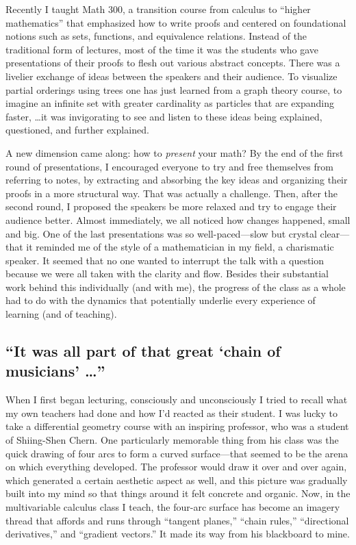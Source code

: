 \documentclass{rs}
\theoremstyle{definition}
\theoremstyle{remark}
\renewcommand{\=}{\approx}
\renewcommand{\-}{\sim}
\numberwithin{equation}{section}
\begin{document}
Recently I taught Math 300, a transition course from calculus to ``higher 
mathematics'' that emphasized how to write proofs and centered on foundational 
notions such as sets, functions, and equivalence relations.  Instead of the 
traditional form of lectures, most of the time it was the students who gave 
presentations of their proofs to flesh out various abstract concepts.  There was 
a livelier exchange of ideas between the speakers and their audience.  To 
visualize partial orderings using trees one has just learned from a graph theory 
course, to imagine an infinite set with greater cardinality as particles that 
are expanding faster, \ldots it was invigorating to see and listen to these 
ideas being explained, questioned, and further explained.  

A new dimension came along: how to {\em present} your math?  By the end of the 
first round of presentations, I encouraged everyone to try and free themselves 
from referring to notes, by extracting and absorbing the key ideas and 
organizing their proofs in a more structural way.  That was actually a 
challenge.  Then, after the second round, I proposed the speakers be more 
relaxed and try to engage their audience better.  Almost immediately, we all 
noticed how changes happened, small and big.  One of the last presentations was 
so well-paced---slow but crystal clear---that it reminded me of the style of a 
mathematician in my field, a charismatic speaker.  It seemed that no one wanted 
to interrupt the talk with a question because we were all taken with the clarity 
and flow.  Besides their substantial work behind this individually (and with 
me), the progress of the class as a whole had to do with the dynamics that 
potentially underlie every experience of learning (and of teaching).  



\subsection*{``It was all part of that great `chain of musicians' \ldots''}

When I first began lecturing, consciously and unconsciously I tried to recall 
what my own teachers had done and how I'd reacted as their student.  I was lucky 
to take a differential geometry course with an inspiring professor, who was a 
student of Shiing-Shen Chern.  One particularly memorable thing from his class 
was the quick drawing of four arcs to form a curved surface---that seemed to be 
the arena on which everything developed.  The professor would draw it over and 
over again, which generated a certain aesthetic aspect as well, and this picture 
was gradually built into my mind so that things around it felt concrete and 
organic.  Now, in the multivariable calculus class I teach, the four-arc surface 
has become an imagery thread that affords and runs through ``tangent planes,'' 
``chain rules,'' ``directional derivatives,'' and ``gradient vectors.''  It made 
its way from his blackboard to mine.  
\end{document}
